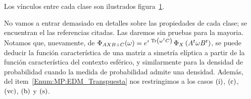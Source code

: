 %
Los v\'inculos entre cada clase son ilustrados figura~\ref{Fig:MP:EDMatrix}.
%
%
\begin{figure}[h!]
\begin{center}  \end{center}
% 
\label{Fig:MP:EDMatrix}
\end{figure}


No vamos a entrar demasiado en  detalles sobre las propiedades de cada clase; se
encuentran el las referencias citadas.  Las daremos sin pruebas para la mayoria.
Notamos que, nuevamente,  de $\Phi_{A X B + C}(\omega)  = e^{\imath \, \operatorname{Tr}\left(
    \omega^t  C \right)}  \,  \Phi_X\left(  A^t \omega  B^t  \right)$, se  puede
deducir la  funci\'on caracter\'istica de  una matriz a simetr\'ia  el\'iptica a
partir de la funci\'on  caracter\'istica del contexto esf\'erico, y similarmente
para la  densidad de  probabilidad cuando la  medida de probabilidad  admite una
densidad.  Adem\'as,  del item~\ref{Enum:MP:EDM_Transpuesta} nos  restringimos a
los casos $(\mathrm{i})$, $(\mathrm{c})$, $(\mathrm{vc})$, $(\mathrm{b})$ y $(\mathrm{s})$.


